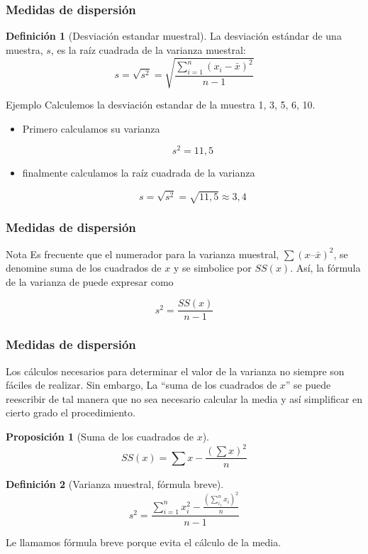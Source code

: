 \documentclass[10pt]{beamer}
\theoremstyle{plain} %
\newtheorem{prop}{Proposición}
\theoremstyle{definition}
\newtheorem{defn}{Definición}
\theoremstyle{remark}
\begin{document}
\begin{frame}
\frametitle{Medidas de dispersión}
\begin{defn}[Desviación estandar muestral]
La desviación estándar de una muestra, $s$, es la raíz cuadrada de la varianza muestral:
$$s=\sqrt{s^2}=\sqrt{\frac{\sum_{i=1}^n(x_i-\bar{x})^2}{n-1}}$$
\end{defn}
\begin{exampleblock}{Ejemplo}
Calculemos la desviación estandar de la muestra 1, 3, 5, 6, 10.
\begin{itemize}
\item Primero calculamos su varianza

$$s^2=11{,5}$$

\item finalmente calculamos la raíz cuadrada de la varianza

$$s=\sqrt{s^2}=\sqrt{11{,}5}\approx 3{,4}$$
\end{itemize}
\end{exampleblock}

\end{frame}

\begin{frame}
\frametitle{Medidas de dispersión}
\begin{alertblock}{Nota}
Es frecuente que el numerador para la varianza muestral, $\sum (x – \bar{x})^2$, se denomine suma de los cuadrados de $x$ y se simbolice por $SS(x)$. Así, la fórmula de la varianza de puede expresar como

$$s^2=\frac{SS(x)}{n-1}$$


\end{alertblock}

\end{frame}

\begin{frame}
\frametitle{Medidas de dispersión}
Los cálculos necesarios para determinar el valor de la varianza no siempre son fáciles de realizar. Sin embargo, La ``suma de los cuadrados de $x$'' se puede reescribir de tal manera que no sea necesario calcular la media y así simplificar en cierto grado el procedimiento.\\

\begin{prop}[Suma de los cuadrados de $x$]

$$SS(x)=\sum x-\frac{(\sum x)^2}{n}$$
\end{prop}
\begin{defn}[Varianza muestral, fórmula breve]
$$s^2=\frac{{\sum_{i=1}^n x_i^2}-\frac{\left(\sum_{i_1}^n x_i\right)^2}{n}}{n-1}$$

Le llamamos fórmula breve porque evita el cálculo de la media.
\end{defn}
\end{frame}
\end{document}
